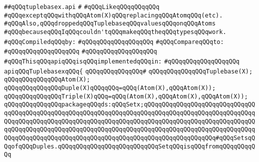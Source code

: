 \label{src/lib/src/tuplebasex.api}
\verb|##qQQqtuplebasex.api|\newline
\verb|#|\newline
\verb|#qQQqLikeqQQqqQQqqQQq|\newline
\verb|#qQQqexceptqQQqwithqQQqAtom(X)qQQqreplacingqQQqAtomqQQq(etc).|\newline
\verb|#qQQqAlso,qQQqdroppedqQQqTuplebaseqQQqvaluesqQQqonqQQqAtoms|\newline
\verb|#qQQqbecauseqQQqIqQQqcouldn'tqQQqmakeqQQqtheqQQqtypesqQQqwork.|\newline
\newline
\verb|#qQQqCompiledqQQqby:|\newline
\verb|#qQQqqQQqqQQqqQQqqQQq|\newline
\newline
\verb|#qQQqCompareqQQqto:|\newline
\verb|#qQQqqQQqqQQqqQQqqQQq|\newline
\verb|#qQQqqQQqqQQqqQQqqQQq|\newline
\newline
\verb|#qQQqThisqQQqapiqQQqisqQQqimplementedqQQqin:|\newline
\verb|#qQQqqQQqqQQqqQQqqQQq|\newline
\newline
\verb|apiqQQqTuplebasexqQQq{|\newline
\verb|qQQqqQQqqQQqqQQq#|\newline
\verb|qQQqqQQqqQQqqQQqTuplebase(X);|\newline
\verb|qQQqqQQqqQQqqQQqAtom(X);|\newline
\newline
\verb|qQQqqQQqqQQqqQQqDuple(X)qQQqqQQq=qQQq(Atom(X),qQQqAtom(X));|\newline
\verb|qQQqqQQqqQQqqQQqTriple(X)qQQq=qQQq(Atom(X),qQQqAtom(X),qQQqAtom(X));|\newline
\newline
\verb|qQQqqQQqqQQqqQQqpackageqQQqds:qQQqSetx;qQQqqQQqqQQqqQQqqQQqqQQqqQQqqQQqqQQqqQQqqQQqqQQqqQQqqQQqqQQqqQQqqQQqqQQqqQQqqQQqqQQqqQQqqQQqqQQqqQQqqQQqqQQqqQQqqQQqqQQqqQQqqQQqqQQqqQQqqQQqqQQqqQQqqQQqqQQqqQQqqQQqqQQqqQQqqQQqqQQqqQQqqQQqqQQqqQQqqQQqqQQqqQQqqQQqqQQqqQQqqQQqqQQqqQQqqQQqqQQqqQQqqQQqqQQqqQQqqQQqqQQqqQQqqQQqqQQqqQQqqQQqqQQqqQQqqQQqqQQq#qQQqSetsqQQqofqQQqDuples.qQQqqQQqqQQqqQQqqQQqqQQqqQQqSetqQQqisqQQqfromqQQqqQQqqQQq|\newline
